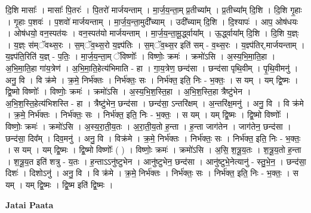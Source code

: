 \documentclass[17pt]{extarticle}
\begin{document}
दि॒शि मासाः᳚ । मासाः᳚ पि॒तरः॑ । पि॒तरो॑ मार्जयन्ताम् । मा॒र्ज॒य॒न्ता॒म् प्र॒तीच्या᳚म् । प्र॒तीच्या᳚म् दि॒शि । दि॒शि गृ॒हाः । गृ॒हाः प॒शवः॑ । प॒शवो॑ मार्जयन्ताम् । मा॒र्ज॒य॒न्ता॒मुदी᳚च्याम् । उदी᳚च्याम् दि॒शि । दि॒श्यापः॑ । आप॒ ओष॑धयः । ओष॑धयो॒ वन॒स्पत॑यः । वन॒स्पत॑यो मार्जयन्ताम् । मा॒र्ज॒य॒न्ता॒मू॒र्द्ध्वाया᳚म् । ऊ॒र्द्ध्वाया᳚म् दि॒शि । दि॒शि य॒ज्ञ्ः । य॒ज्ञ्ः स॑म्ॅवथ्स॒रः । स॒म्ॅव॒थ्स॒रो य॒ज्ञ्प॑तिः । स॒म्ॅव॒थ्स॒र इति॑ सम् - व॒थ्स॒रः । य॒ज्ञ्प॑तिर्,मार्जयन्ताम् । य॒ज्ञ्प॑ति॒रिति॑ य॒ज्ञ् - प॒तिः॒ । मा॒र्ज॒य॒न्ता॒म् ॅविष्णोः᳚ । विष्णोः॒ क्रमः॑ । क्रमो॑ऽसि । अ॒स्य॒भि॒मा॒ति॒हा । अ॒भि॒मा॒ति॒हा गा॑य॒त्रेण॑ । अ॒भि॒मा॒ति॒हेत्य॑भिमाति - हा । गा॒य॒त्रेण॒ छन्द॑सा । छन्द॑सा पृथि॒वीम् । पृ॒थि॒वीमनु॑ । अनु॒ वि । वि क्र॑मे । क्र॒मे॒ निर्भ॑क्तः । निर्भ॑क्तः॒ सः । निर्भ॑क्त॒ इति॒ निः - भ॒क्तः॒ । स यम् । यम् द्वि॒ष्मः । द्वि॒ष्मो विष्णोः᳚ । विष्णोः॒ क्रमः॑ । क्रमो॑ऽसि । अ॒स्य॒भि॒श॒स्ति॒हा । अ॒भि॒श॒स्ति॒हा त्रैष्टु॑भेन । अ॒भि॒श॒स्ति॒हेत्य॑भिशस्ति - हा । त्रैष्टु॑भेन॒ छन्द॑सा । छन्द॑सा॒ ऽन्तरि॑क्षम् । अ॒न्तरि॑क्ष॒मनु॑ । अनु॒ वि । वि क्र॑मे । क्र॒मे॒ निर्भ॑क्तः । निर्भ॑क्तः॒ सः । निर्भ॑क्त॒ इति॒ निः - भ॒क्तः॒ । स यम् । यम् द्वि॒ष्मः । द्वि॒ष्मो विष्णोः᳚ । विष्णोः॒ क्रमः॑ । क्रमो॑ऽसि । अ॒स्य॒रा॒ती॒य॒तः । अ॒रा॒ती॒य॒तो ह॒न्ता । ह॒न्ता जाग॑तेन । जाग॑तेन॒ छन्द॑सा । छन्द॑सा॒ दिव᳚म् । दिव॒मनु॑ । अनु॒ वि । विक्र॑मे । क्र॒मे॒ निर्भ॑क्तः । निर्भ॑क्तः॒ सः । निर्भ॑क्त॒ इति॒ निः - भ॒क्तः॒ । स यम् । यम् द्वि॒ष्मः । द्वि॒ष्मो विष्णोः᳚ ( ) । विष्णोः॒ क्रमः॑ । क्रमो॑ऽसि । अ॒सि॒ श॒त्रू॒य॒तः । श॒त्रू॒य॒तो ह॒न्ता । श॒त्रू॒य॒त इति॑ शत्रु - य॒तः । ह॒न्ताऽऽनु॑ष्टुभेन । आनु॑ष्टुभेन॒ छन्द॑सा । आनु॑ष्टुभे॒नेत्यानु॑ - स्तु॒भे॒न॒ । छन्द॑सा॒ दिशः॑ । दिशोऽनु॑ । अनु॒ वि । वि क्र॑मे । क्र॒मे॒ निर्भ॑क्तः । निर्भ॑क्तः॒ सः । निर्भ॑क्त॒ इति॒ निः - भ॒क्तः॒ । स यम् । यम् द्वि॒ष्मः । द्वि॒ष्म इति॑ द्वि॒ष्मः । \newline

\textbf{Jatai Paata} \newline
\end{document}
